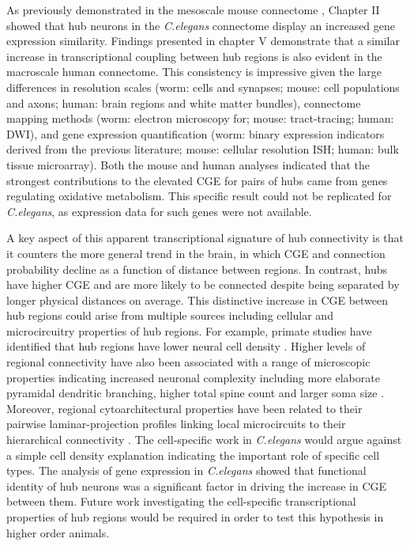 As previously demonstrated in the mesoscale mouse connectome \citep{Fulcher2016}, Chapter II showed that hub neurons in the \textit{C.elegans} connectome display an increased gene expression similarity. Findings presented in chapter V demonstrate that a similar increase in transcriptional coupling between hub regions is also evident in the macroscale human connectome. This consistency is impressive given the large differences in resolution scales (worm: cells and synapses; mouse: cell populations and axons; human: brain regions and white matter bundles), connectome mapping methods (worm: electron microscopy for; mouse: tract-tracing; human: DWI), and gene expression quantification (worm: binary expression indicators derived from the previous literature; mouse: cellular resolution ISH; human: bulk tissue microarray). Both the mouse and human analyses indicated that the strongest contributions to the elevated CGE for pairs of hubs came from genes regulating oxidative metabolism. This specific result could not be replicated for \textit{C.elegans}, as expression data for such genes were not available.

A key aspect of this apparent transcriptional signature of hub connectivity is that it counters the more general trend in the brain, in which CGE and connection probability decline as a function of distance between regions. In contrast, hubs have higher CGE and are more likely to be connected despite being separated by longer physical distances on average. This distinctive increase in CGE between hub regions could arise from multiple sources including cellular and microcircuitry properties of hub regions. For example, primate studies have identified that hub regions have lower neural cell density \citep{Beul2017,Scholtens2014}. Higher levels of regional connectivity have also been associated with a range of microscopic properties indicating increased neuronal complexity including more elaborate pyramidal dendritic branching, higher total spine count and larger soma size \citep{Scholtens2014}. Moreover, regional cytoarchitectural properties have been related to their pairwise laminar-projection profiles linking local microcircuits to their hierarchical connectivity \citep{Barbas}. The cell-specific work in \textit{C.elegans} would argue against a simple cell density explanation indicating the important role of specific cell types. The analysis of gene expression in \textit{C.elegans} showed that functional identity of hub neurons was a significant factor in driving the increase in CGE between them. Future work investigating the cell-specific transcriptional properties of hub regions would be required in order to test this hypothesis in higher order animals.

